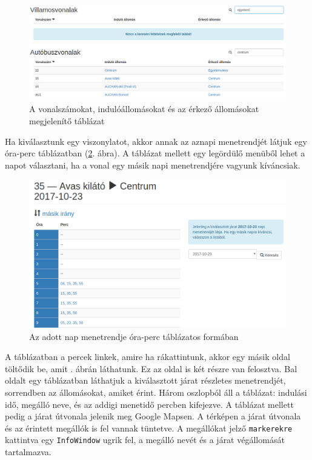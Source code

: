 \begin{figure}[h!]
\centering
\includegraphics[scale=0.32]{kepek/vonalak_tablazat.png}
\caption{A vonalszámokat, indulóállomásokat és az érkező állomásokat megjelenítő táblázat}
\label{fig:vonalak_tablazat}
\end{figure}

Ha kiválasztunk egy viszonylatot, akkor annak az aznapi menetrendjét látjuk egy óra-perc táblázatban (\ref{fig:menetrend}. ábra). A táblázat mellett egy legördülő menüből lehet a napot választani, ha a vonal egy másik napi menetrendjére vagyunk kíváncsiak.

\begin{figure}[h!]
\centering
\includegraphics[scale=0.4]{kepek/menetrend.png}
\caption{Az adott nap menetrendje óra-perc táblázatos formában}
\label{fig:menetrend}
\end{figure}

A táblázatban a percek linkek, amire ha rákattintunk, akkor egy másik oldal töltődik be, amit . ábrán láthatunk. Ez az oldal is két részre van felosztva. Bal oldalt egy táblázatban láthatjuk a kiválasztott járat részletes menetrendjét, sorrendben az állomásokat, amiket érint. Három oszlopból áll a táblázat: indulási idő, megálló neve, és az addigi menetidő percben kifejezve. A táblázat mellett pedig a járat útvonala jelenik meg Google Mapsen. A térképen a járat útvonala és az érintett megállók is fel vannak tüntetve. A megállókat jelző \texttt{markerekre} kattintva egy \texttt{InfoWindow} ugrik fel, a megálló nevét és a járat végállomását tartalmazva.

